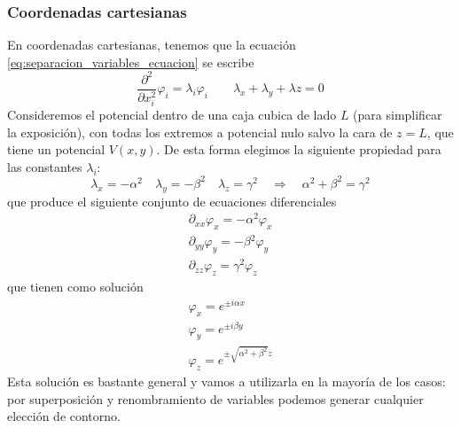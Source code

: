 \documentclass[a4paper]{article}
\numberwithin{equation}{section} %
\begin{document}
\subsubsection{Coordenadas cartesianas}
En coordenadas cartesianas, tenemos que la ecuación \ref{eq:separacion_variables_ecuacion} se escribe
\begin{equation}
  \frac{\partial^2}{\partial x_i^2} \varphi_{i} = \lambda_i \varphi_i \qquad \lambda_x + \lambda_y + \lambda z = 0
\end{equation}
Consideremos el potencial dentro de una caja cubica de lado $L$ (para simplificar la exposición), con todas los extremos a potencial nulo salvo la cara de $z = L$, que tiene un potencial $V(x,y)$. De esta forma elegimos la siguiente propiedad para las constantes $\lambda_i$:
\begin{equation}
  \lambda_x = - \alpha^2 \quad \lambda_y = - \beta^2 \quad \lambda_z = \gamma^2 \quad \Rightarrow \quad \alpha^2 + \beta^2 = \gamma^2
\end{equation}
que produce el siguiente conjunto de ecuaciones diferenciales
\begin{equation}
  \begin{gathered}
    \partial_{xx} \varphi_x = - \alpha{^2} \varphi_x \\
    \partial_{yy} \varphi_y = - \beta{^2} \varphi_y \\
    \partial_{zz} \varphi_z =  \gamma{^2} \varphi_z
  \end{gathered}
\end{equation}
que tienen como solución
\begin{equation}
  \begin{gathered}
    \varphi_{x} = e^{\pm i \alpha x}\\
    \varphi_y = e^{\pm i \beta y}\\
    \varphi_z = e^{\pm \sqrt{\alpha^2 + \beta^2} z}
  \end{gathered}
  \label{eq:separacion_variables_cartesiana}
\end{equation}
Esta solución es bastante general y vamos a utilizarla en la mayoría de los casos: por superposición y renombramiento de variables podemos generar cualquier elección de contorno.
\end{document}
